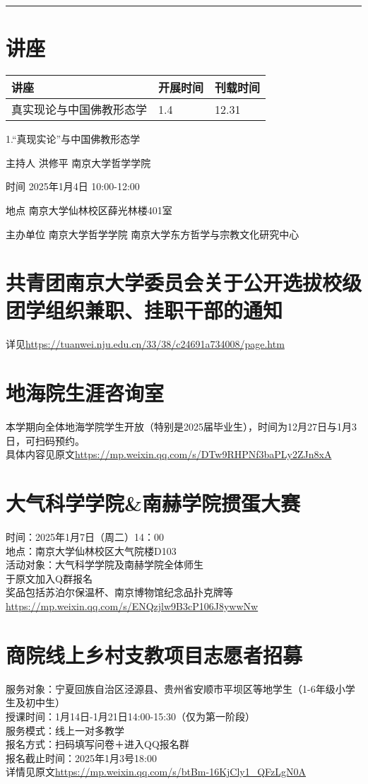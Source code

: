 \documentclass[letterpaper, 12pt]{article}
\begin{document}
\hrule
\pagebreak
\begin{multicols}{2}

\section{讲座}
\begin{tabularx}{0.5\textwidth}{|X|X|X|}
    \hline
    讲座 & 开展时间 & 刊载时间\\
    \hline\hline
真实现论与中国佛教形态学 & 1.4 & 12.31\\\hline

\end{tabularx}
1.“真现实论”与中国佛教形态学

主持人 洪修平 南京大学哲学学院

时间 2025年1月4日 10:00-12:00

地点 南京大学仙林校区薛光林楼401室

主办单位 南京大学哲学学院 南京大学东方哲学与宗教文化研究中心
\section{共青团南京大学委员会关于公开选拔校级团学组织兼职、挂职干部的通知}
详见\url{https://tuanwei.nju.edu.cn/33/38/c24691a734008/page.htm}
\section{地海院生涯咨询室}
本学期向全体地海学院学生开放（特别是2025届毕业生），时间为12月27日与1月3日，可扫码预约。\\
具体内容见原文\url{https://mp.weixin.qq.com/s/DTw9RHPNf3baPLy2ZJn8xA}

\section{大气科学学院\&南赫学院掼蛋大赛}
时间：2025年1月7日（周二）14：00\\
地点：南京大学仙林校区大气院楼D103\\
活动对象：大气科学学院及南赫学院全体师生\\
于原文加入Q群报名\\
奖品包括苏泊尔保温杯、南京博物馆纪念品扑克牌等\\
\url{https://mp.weixin.qq.com/s/ENQzjlw9B3cP106J8ywwNw}\\


\section{商院线上乡村支教项目志愿者招募}
服务对象：宁夏回族自治区泾源县、贵州省安顺市平坝区等地学生（1-6年级小学生及初中生）\\
授课时间：1月14日-1月21日14:00-15:30（仅为第一阶段）\\
服务模式：线上一对多教学\\
报名方式：扫码填写问卷＋进入QQ报名群\\
报名截止时间：2025年1月3号18:00\\
详情见原文\url{https://mp.weixin.qq.com/s/btBm-16KjCly1_QFzLgN0A}\\


\end{multicols}
\end{document}
